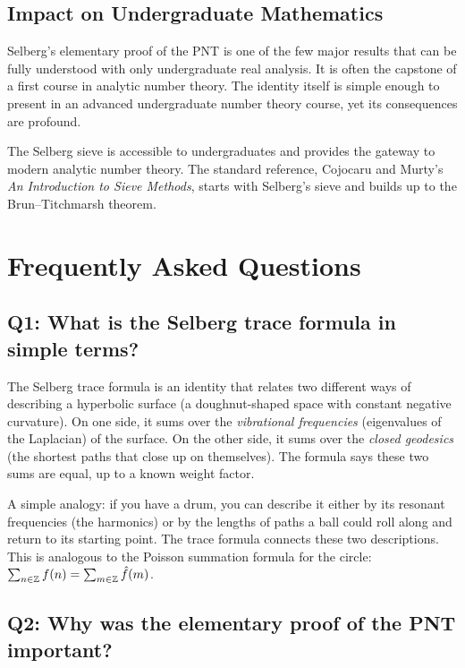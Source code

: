 \subsection{Impact on Undergraduate Mathematics}

Selberg's elementary proof of the PNT is one of the few major results that can be fully understood with only undergraduate real analysis. It is often the capstone of a first course in analytic number theory. The identity itself is simple enough to present in an advanced undergraduate number theory course, yet its consequences are profound.

The Selberg sieve is accessible to undergraduates and provides the gateway to modern analytic number theory. The standard reference, Cojocaru and Murty's \emph{An Introduction to Sieve Methods}, starts with Selberg's sieve and builds up to the Brun--Titchmarsh theorem.

\section{Frequently Asked Questions}

\subsection*{Q1: What is the Selberg trace formula in simple terms?}

The Selberg trace formula is an identity that relates two different ways of describing a hyperbolic surface (a doughnut-shaped space with constant negative curvature). On one side, it sums over the \emph{vibrational frequencies} (eigenvalues of the Laplacian) of the surface. On the other side, it sums over the \emph{closed geodesics} (the shortest paths that close up on themselves). The formula says these two sums are equal, up to a known weight factor.

A simple analogy: if you have a drum, you can describe it either by its resonant frequencies (the harmonics) or by the lengths of paths a ball could roll along and return to its starting point. The trace formula connects these two descriptions. This is analogous to the Poisson summation formula for the circle: \(\sum_{n \in \mathbb{Z}} f(n) = \sum_{m \in \mathbb{Z}} \hat f(m)\).

\subsection*{Q2: Why was the elementary proof of the PNT important?}


